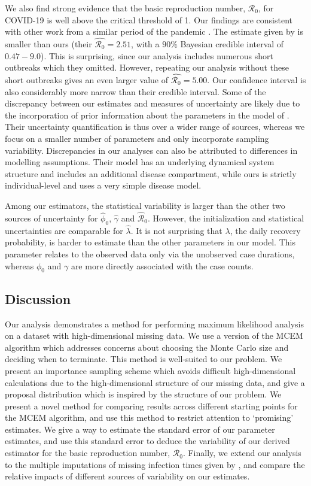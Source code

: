 \documentclass[11pt, oneside]{article}   	%
\newcommand{\RO}{\mathscr{R}_0}	%
\begin{document}
We also find strong evidence that the basic reproduction number, $\RO$, for COVID-19 is well above the critical threshold of 1. Our findings are consistent with other work from a similar period of the pandemic \citep[see, e.g.,][for systematic reviews]{Liu20, Ali20}. The estimate given by \citet{Sto22} is smaller than ours (their $\hat{\RO} = 2.51$, with a $90\%$ Bayesian credible interval of $0.47 - 9.0$). This is surprising, since our analysis includes numerous short outbreaks which they omitted. However, repeating our analysis without these short outbreaks gives an even larger value of $\hat{\RO} = 5.00$. Our confidence interval is also considerably more narrow than their credible interval. Some of the discrepancy between our estimates and measures of uncertainty are likely due to the incorporation of prior information about the parameters in the model of \citeauthor{Sto22}. Their uncertainty quantification is thus over a wider range of sources, whereas we focus on a smaller number of parameters and only incorporate sampling variability. Discrepancies in our analyses can also be attributed to differences in modelling assumptions. Their model has an underlying dynamical system structure and includes an additional disease compartment, while ours is strictly individual-level and uses a very simple disease model. 

Among our estimators, the statistical variability is larger than the other two sources of uncertainty for $\hat{\phi}_0$, $\hat{\gamma}$ and $\hat{\mathcal{R}}_0$. However, the initialization and statistical uncertainties are comparable for $\hat{\lambda}$. It is not surprising that $\lambda$, the daily recovery probability, is harder to estimate than the other parameters in our model. This parameter relates to the observed data only via the unobserved case durations, whereas $\phi_0$ and $\gamma$ are more directly associated with the case counts.

\subsection{Discussion}
Our analysis demonstrates a method for performing maximum likelihood analysis on a dataset with high-dimensional missing data. We use a version of the MCEM algorithm which addresses concerns about choosing the Monte Carlo size and deciding when to terminate. This method is well-suited to our problem. We present an importance sampling scheme which avoids difficult high-dimensional calculations due to the high-dimensional structure of our missing data, and give a proposal distribution which is inspired by the structure of our problem. We present a novel method for comparing results across different starting points for the MCEM algorithm, and use this method to restrict attention to `promising' estimates. We give a way to estimate the standard error of our parameter estimates, and use this standard error to deduce the variability of our derived estimator for the basic reproduction number, $\RO$. Finally, we extend our analysis to the multiple imputations of missing infection times given by \citet{Sto22}, and compare the relative impacts of different sources of variability on our estimates.
\end{document}
